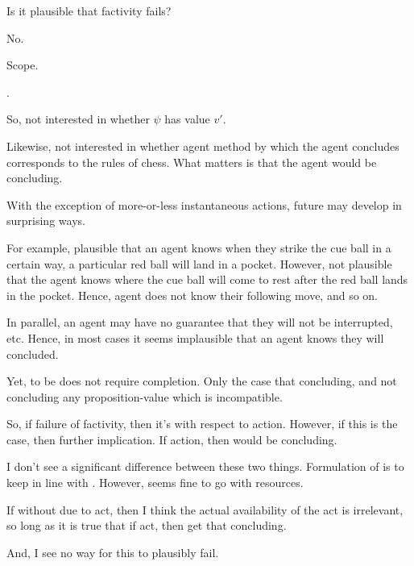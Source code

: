 \begin{note}
  Is it plausible that factivity fails?

  No.
\end{note}

\begin{note}
  Scope.

  \fc{}.
\end{note}

\begin{note}
  So, not interested in whether \(\psi\) has value \(v'\).

  Likewise, not interested in whether agent method by which the agent concludes corresponds to the rules of chess.
  What matters is that the agent would be concluding.
\end{note}

\begin{note}
  With the exception of more-or-less instantaneous actions, future may develop in surprising ways.

  For example, plausible that an agent knows when they strike the cue ball in a certain way, a particular red ball will land in a pocket.
  However, not plausible that the agent knows where the cue ball will come to rest after the red ball lands in the pocket.
  Hence, agent does not know their following move, and so on.

  In parallel, an agent may have no guarantee that they will not be interrupted, etc.
  Hence, in most cases it seems implausible that an agent knows they will concluded.

  Yet, to be \fc{} does not require completion.
  Only the case that concluding, and not concluding any proposition-value which is incompatible.
\end{note}

\begin{note}
  So, if failure of factivity, then it's with respect to action.
  However, if this is the case, then further implication.
  If action, then would be concluding.

  I don't see a significant difference between these two things.
  Formulation of \fc{} is to keep in line with \supportI{}.
  However, seems fine to go with resources.

  If \ros{} without \wit{} due to act, then I think the actual availability of the act is irrelevant, so long as it is true that if act, then get that concluding.

  And, I see no way for this to plausibly fail.
\end{note}

